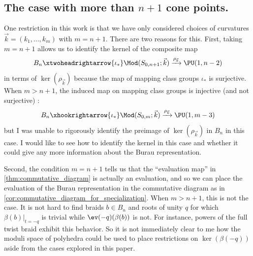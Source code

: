 \documentclass{amsart}
\begin{document}
    \subsection*{The case with more than \texorpdfstring{$n+1$}{n+1} cone points.} One restriction in this work is that we have only considered choices of curvatures $\vec k = (k_1,\dotsc,k_m)$ with $m=n+1$. There are two reasons for this. First, taking $m=n+1$ allows us to identify the kernel of the composite map
    \begin{equation*}
        B_n \xtwoheadrightarrow{\iota_*} \Mod(S_{0,n+1};\vec k) \xrightarrow{\rho_{\vec k}} \PU(1,n-2)
    \end{equation*}
    in terms of $\ker (\rho_{\vec k})$ because the map of mapping class groups $\iota_*$ is surjective. When $m > n+1$, the induced map on mapping class groups is injective (and not surjective) \cite[Theorem 3.18]{Farb2012AGroups}:
    \begin{equation*}
        B_n \xhookrightarrow{\iota_*} \Mod(S_{0,m};\vec k) \xrightarrow{\rho_{\vec k}} \PU(1,m-3)
    \end{equation*}
    but I was unable to rigorously identify the preimage of $\ker (\rho_{\vec k})$ in $B_n$ in this case. I would like to see how to identify the kernel in this case and whether it could give any more information about the Burau representation.

    Second, the condition $m=n+1$ tells us that the ``evaluation map'' in \cref{thm:commutative_diagram} is actually an evaluation, and so we can place the evaluation of the Burau representation in the commutative diagram as in \cref{cor:commutative_diagram_for_specialization}. When $m>n+1$, this is not the case. It is not hard to find braids $b \in B_n$ and roots of unity $q$ for which $\beta(b)|_{t=-q}$ is trivial while $\ev(-q)(\beta(b))$ is not. For instance, powers of the full twist braid exhibit this behavior. So it is not immediately clear to me how the moduli space of polyhedra could be used to place restrictions on $\ker(\beta(-q))$ aside from the cases explored in this paper.
\end{document}
